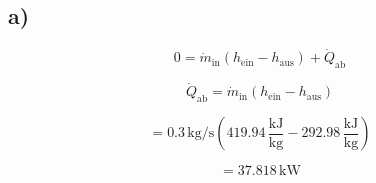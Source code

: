 

\subsection*{a)}

\[
0 = \dot{m}_{\text{in}} (h_{\text{ein}} - h_{\text{aus}}) + \dot{Q}_{\text{ab}}
\]

\[
\dot{Q}_{\text{ab}} = \dot{m}_{\text{in}} (h_{\text{ein}} - h_{\text{aus}})
\]

\[
= 0.3 \, \text{kg/s} \left( 419.94 \, \frac{\text{kJ}}{\text{kg}} - 292.98 \, \frac{\text{kJ}}{\text{kg}} \right)
\]

\[
= 37.818 \, \text{kW}
\]